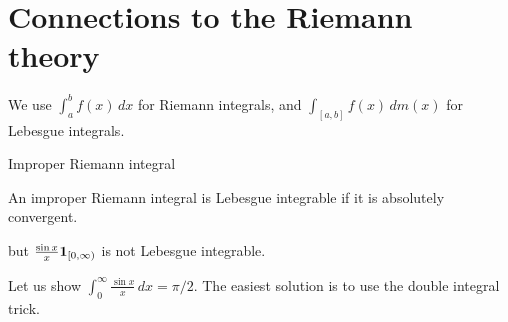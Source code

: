 \section{Connections to the Riemann theory}

\begin{namedthm}
    
\end{namedthm}

We use $\int_a^b f(x)\,dx$ for Riemann integrals, and $\int_{[a,b]} f(x)\,dm(x)$ for Lebesgue integrals.

Improper Riemann integral 

An improper Riemann integral is Lebesgue integrable if it is absolutely convergent.

 but $\frac{\sin x}{x} \mathbf{1}_{[0,\infty)}$ is not Lebesgue integrable.

\begin{namedthm}
    Let us show $\int_{0}^\infty \frac{\sin x}{x}\,dx = \pi/2$. The easiest solution is to use the double integral trick.
\end{namedthm}

